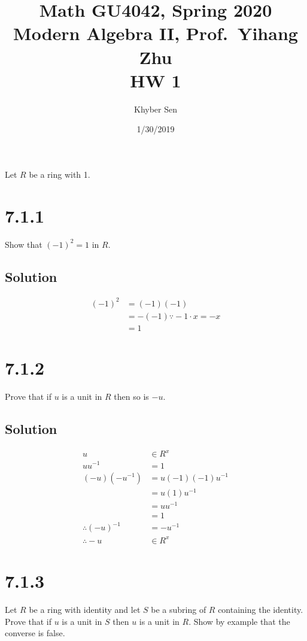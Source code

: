 \documentclass[fleqn]{article}
\title{
Math GU4042, Spring 2020 \\
Modern Algebra II, Prof.\ Yihang Zhu \\
HW 1
}
\author{Khyber Sen}
\date{1/30/2019}
\begin{document}
    
    \maketitle
    
    Let $R$ be a ring with 1.
    
    \section{7.1.1}
    Show that $(-1)^2 = 1$ in $R$.
        
        \subsection{Solution}
        \begin{align}
            (-1)^2 &= (-1)(-1) \\
                &= -(-1) \because{} -1 \cdot x = -x \\
                &= 1
        \end{align}
    
    \section{7.1.2}
    Prove that if $u$ is a unit in $R$ then so is $-u$.
        
        \subsection{Solution}
        \begin{align}
            u &\in R^x \\
            u u^{-1} &= 1 \\
            (-u)(-u^{-1}) &= u (-1)(-1) u^{-1} \\
                &= u (1) u^{-1} \\
                &= u u^{-1} \\
                &= 1 \\
            \therefore{} (-u)^{-1} &= -u^{-1} \\
            \therefore{} -u &\in R^x
        \end{align}
    
    \section{7.1.3}
    Let $R$ be a ring with identity and let $S$ be a subring of $R$ containing the identity.  Prove that if $u$ is a unit in $S$ then $u$ is a unit in $R$.  Show by example that the converse is false.
        
\end{document}
